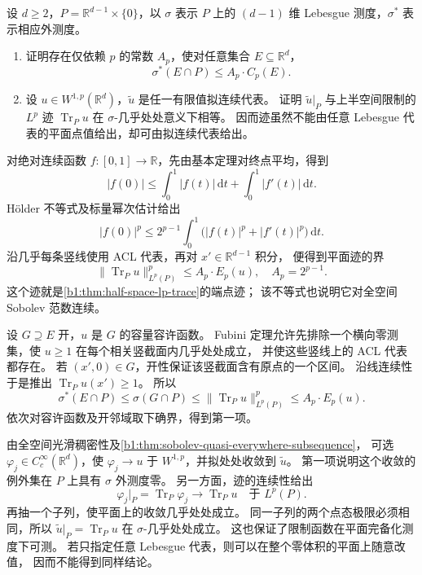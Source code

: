 \begin{exercise}\label{b1:ex:26-quasicontinuous-plane-trace}
设 \(d\ge2\)，\(P=\mathbb R^{d-1}\times\{0\}\)，以 \(\sigma\) 表示 \(P\) 上的
\((d-1)\) 维 Lebesgue 测度，\(\sigma^*\) 表示相应外测度。
\begin{enumerate}
 \item\label{b1:item:26-plane-capacity-control}
 证明存在仅依赖 \(p\) 的常数 \(A_p\)，使对任意集合 \(E\subseteq\mathbb R^d\)，
 \[
  \sigma^*(E\cap P)\le A_p\cdot C_p(E).
 \]
 \item\label{b1:item:26-plane-trace-representative}
 设 \(u\in W^{1,p}(\mathbb R^d)\)，\(\widetilde u\) 是任一有限值拟连续代表。
 证明 \(\widetilde u|_P\) 与上半空间限制的 \(L^p\) 迹
 \(\operatorname{Tr}_P u\) 在 \(\sigma\)-几乎处处意义下相等。
 因而迹虽然不能由任意 Lebesgue 代表的平面点值给出，却可由拟连续代表给出。
\end{enumerate}
\end{exercise}
\begin{solution}
对绝对连续函数 \(f\colon[0,1]\rightarrow\mathbb R\)，先由基本定理对终点平均，得到
\[
 |f(0)|\le\int_0^1|f(t)|\,\mathrm dt+\int_0^1|f'(t)|\,\mathrm dt.
\]
Hölder 不等式及标量幂次估计给出
\[
 |f(0)|^p\le2^{p-1}\int_0^1\bigl(|f(t)|^p+|f'(t)|^p\bigr)\,\mathrm dt.
\]
沿几乎每条竖线使用 ACL 代表，再对 \(x'\in\mathbb R^{d-1}\) 积分，
便得到平面迹的界
\[
 \|\operatorname{Tr}_P u\|_{L^p(P)}^p\le A_p\cdot E_p(u),
 \quad A_p=2^{p-1}.
\]
这个迹就是\cref{b1:thm:half-space-lp-trace}的端点迹；
该不等式也说明它对全空间 Sobolev 范数连续。

设 \(G\supseteq E\) 开，\(u\) 是 \(G\) 的容量容许函数。
Fubini 定理允许先排除一个横向零测集，使 \(u\ge1\) 在每个相关竖截面内几乎处处成立，
并使这些竖线上的 ACL 代表都存在。
若 \((x',0)\in G\)，开性保证该竖截面含有原点的一个区间。
沿线连续性于是推出 \(\operatorname{Tr}_P u(x')\ge1\)。
所以
\[
 \sigma^*(E\cap P)\le\sigma(G\cap P)
 \le\|\operatorname{Tr}_P u\|_{L^p(P)}^p
 \le A_p\cdot E_p(u).
\]
依次对容许函数及开邻域取下确界，得到第一项。

由全空间光滑稠密性及\cref{b1:thm:sobolev-quasi-everywhere-subsequence}，
可选 \(\varphi_j\in C_c^\infty(\mathbb R^d)\)，使
\(\varphi_j\to u\) 于 \(W^{1,p}\)，并拟处处收敛到 \(\widetilde u\)。
第一项说明这个收敛的例外集在 \(P\) 上具有 \(\sigma\) 外测度零。
另一方面，迹的连续性给出
\[
 \varphi_j|_P=\operatorname{Tr}_P\varphi_j
       \longrightarrow\operatorname{Tr}_P u
       \quad\text{于 }L^p(P).
\]
再抽一个子列，使平面上的收敛几乎处处成立。
同一子列的两个点态极限必须相同，所以
\(\widetilde u|_P=\operatorname{Tr}_P u\) 在 \(\sigma\)-几乎处处成立。
这也保证了限制函数在平面完备化测度下可测。
若只指定任意 Lebesgue 代表，则可以在整个零体积的平面上随意改值，
因而不能得到同样结论。
\end{solution}

